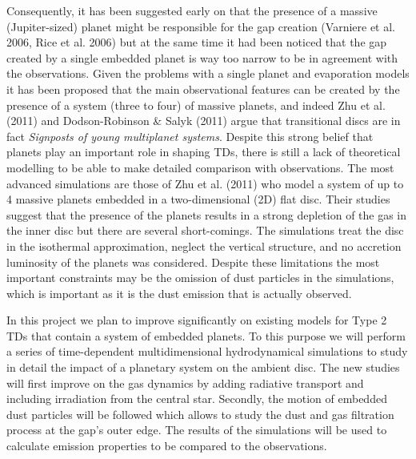 Consequently, it has been suggested early on that the presence of a massive
(Jupiter-sized) planet might be responsible for the gap creation (Varniere et al. 2006,
Rice et al. 2006)
but at the same time it had been noticed that the gap created
by a single embedded planet is way too narrow to be in agreement with the observations.
Given the problems with a single planet and evaporation models it has been proposed that the main observational
features can be created by the presence of a system (three to four) of massive planets, and indeed
Zhu et al. (2011) and Dodson-Robinson \& Salyk (2011)
argue that transitional discs are in fact {\itshape Signposts of young multiplanet systems}.
Despite this strong belief that planets play an important role in shaping TDs, there
is still a lack of theoretical modelling to be able to make detailed comparison with observations.
The most advanced simulations are those of Zhu et al. (2011) who model a system of up to 4 massive planets embedded
in a two-dimensional (2D) flat disc. Their studies suggest that the presence of the planets results in a
strong depletion of the gas in the inner disc but there are several short-comings. The simulations treat the disc in the
isothermal approximation, neglect the vertical structure, and no accretion luminosity of the
planets was considered. Despite these limitations the most important constraints may be the omission of
dust particles in the simulations, which is important as it is the dust emission that is actually observed.

\vspace{0.5em}
In this project we plan to improve significantly on existing models for Type 2 TDs that contain a system of embedded planets.
To this purpose we will perform a series of time-dependent multidimensional hydrodynamical simulations to study in detail the impact of
a planetary system on the ambient disc. The new studies will first improve on the gas dynamics by adding radiative transport
and including irradiation from the central star. Secondly, the motion of embedded dust particles will be followed
which allows to study the dust and gas filtration process at the gap's outer edge.
The results of the simulations will be used to calculate emission properties to be compared to the observations.

